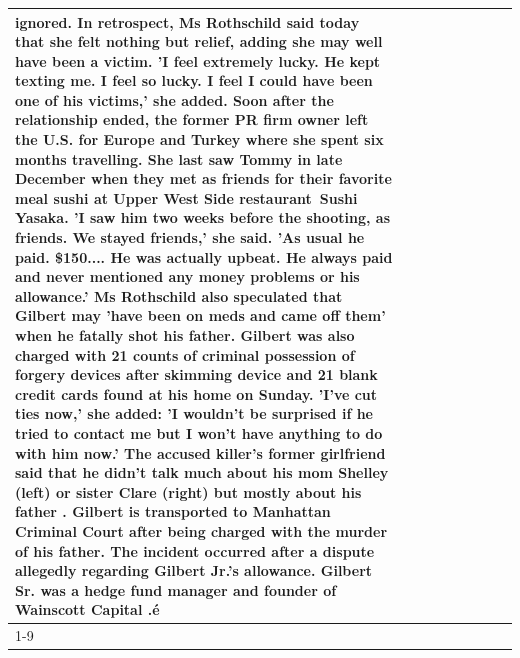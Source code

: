 \begin{table}[H]
\begin{tabular}{lllrlllll}
ignored. In retrospect, Ms Rothschild said today that she felt nothing but relief, adding she may well have been a victim. 'I feel extremely lucky. He kept texting me. I feel so lucky. I feel I could have been one of his victims,' she added. Soon after the relationship ended, the former PR firm owner left the U.S. for Europe and Turkey where she spent six months  travelling. She last saw Tommy in late December when they met as friends for their favorite meal sushi at Upper West Side restaurant Sushi Yasaka. 'I saw him two weeks before the shooting, as friends. We stayed friends,' she said. 'As usual he paid. \$150.... He was actually upbeat. He always paid and never mentioned any money problems or his allowance.' Ms Rothschild also speculated that Gilbert may 'have been on meds and came off them' when he fatally shot his father. Gilbert was also charged with 21 counts of criminal possession of forgery devices after skimming device and 21 blank credit cards found at his home on Sunday. 'I've cut ties now,' she added: 'I wouldn’t be surprised if he tried to contact me but I won’t have anything to do with him now.' The accused killer's former girlfriend said that he didn't talk much about his mom Shelley (left) or sister Clare (right) but mostly about his father . Gilbert is transported to Manhattan Criminal Court  after being charged with the murder of his father. The incident occurred after a dispute allegedly regarding Gilbert Jr.'s allowance. Gilbert Sr. was a hedge fund manager and founder of Wainscott Capital .é \\
\cline{1-9}

\end{tabular}
\end{table}
